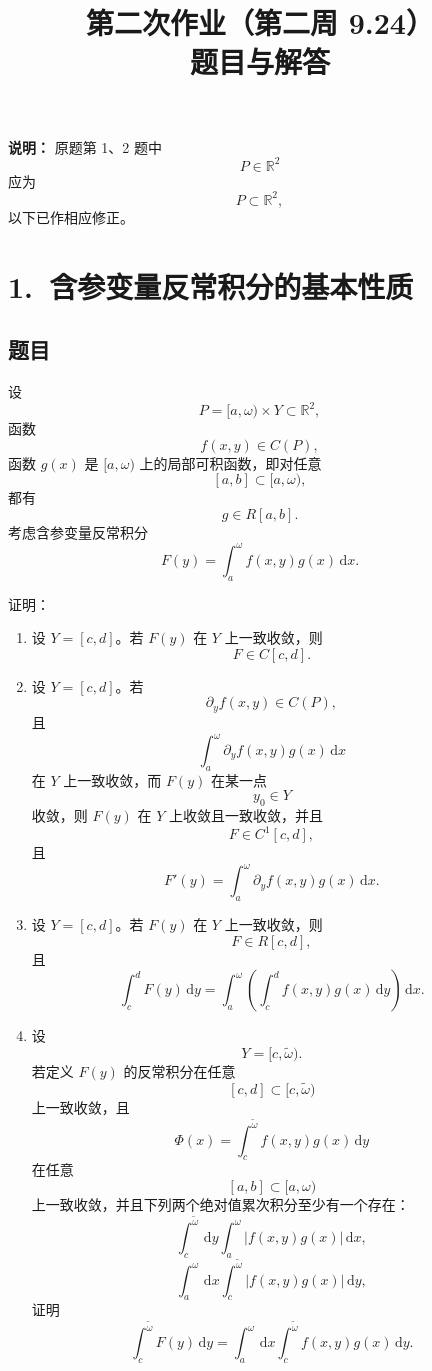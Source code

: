 \documentclass[12pt,a4paper]{ctexart}
\title{\textbf{第二次作业（第二周 9.24）}\\[0.5em]
\large 题目与解答}
\author{}
\date{}
\newcommand{\dd}{\,\mathrm d}
\newcommand{\R}{\mathbb R}
\begin{document}
\maketitle

\noindent
\textbf{说明：}
原题第 1、2 题中
\[
P\in\mathbb R^2
\]
应为
\[
P\subset\mathbb R^2,
\]
以下已作相应修正。

\section*{1.\ 含参变量反常积分的基本性质}

\subsection*{题目}

设
\[
P=[a,\omega)\times Y\subset\R^2,
\]
函数
\[
f(x,y)\in C(P),
\]
函数 \(g(x)\) 是 \([a,\omega)\) 上的局部可积函数，即对任意
\[
[a,b]\subset[a,\omega),
\]
都有
\[
g\in R[a,b].
\]
考虑含参变量反常积分
\[
F(y)=\int_a^\omega f(x,y)g(x)\dd x.
\]

证明：

\begin{enumerate}[label=(\arabic*),leftmargin=3em]
\item
设 \(Y=[c,d]\)。若 \(F(y)\) 在 \(Y\) 上一致收敛，则
\[
F\in C[c,d].
\]

\item
设 \(Y=[c,d]\)。若
\[
\partial_y f(x,y)\in C(P),
\]
且
\[
\int_a^\omega \partial_y f(x,y)g(x)\dd x
\]
在 \(Y\) 上一致收敛，而 \(F(y)\) 在某一点
\[
y_0\in Y
\]
收敛，则 \(F(y)\) 在 \(Y\) 上收敛且一致收敛，并且
\[
F\in C^1[c,d],
\]
且
\[
F'(y)
=
\int_a^\omega
\partial_y f(x,y)g(x)\dd x.
\]

\item
设 \(Y=[c,d]\)。若 \(F(y)\) 在 \(Y\) 上一致收敛，则
\[
F\in R[c,d],
\]
且
\[
\int_c^d F(y)\dd y
=
\int_a^\omega
\left(
\int_c^d f(x,y)g(x)\dd y
\right)\dd x.
\]

\item
设
\[
Y=[c,\widetilde\omega).
\]
若定义 \(F(y)\) 的反常积分在任意
\[
[c,d]\subset[c,\widetilde\omega)
\]
上一致收敛，且
\[
\Phi(x)
=
\int_c^{\widetilde\omega}
f(x,y)g(x)\dd y
\]
在任意
\[
[a,b]\subset[a,\omega)
\]
上一致收敛，并且下列两个绝对值累次积分至少有一个存在：
\[
\int_c^{\widetilde\omega}
\dd y
\int_a^\omega
|f(x,y)g(x)|\dd x,
\]
\[
\int_a^\omega
\dd x
\int_c^{\widetilde\omega}
|f(x,y)g(x)|\dd y,
\]
证明
\[
\int_c^{\widetilde\omega}F(y)\dd y
=
\int_a^\omega
\dd x
\int_c^{\widetilde\omega}
f(x,y)g(x)\dd y.
\]
\end{enumerate}
\end{document}
